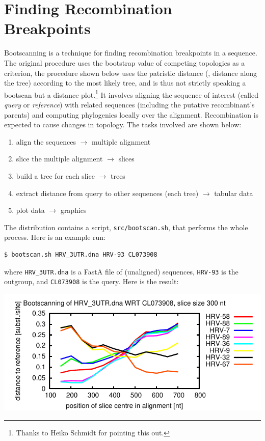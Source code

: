 \section{Finding Recombination Breakpoints}
\label{sct_bootscanning}

Bootscanning is a technique for finding recombination breakpoints in a
sequence. The original procedure \cite{Salminen_1995} uses the bootstrap value
of competing topologies as a criterion, the procedure shown below uses the
patristic distance (\ie, distance along the tree) according to the most likely
tree, and is thus not strictly speaking a bootscan but a distance
plot.\footnote{Thanks to Heiko Schmidt for pointing this out.} It involves
aligning the sequence of interest (called \emph{query} or \emph{reference})
with related sequences (including the putative recombinant's parents) and
computing phylogenies locally over the alignment.  Recombination is expected to
cause changes in topology.  The tasks involved are shown below:
\begin{enumerate}
\item align the sequences $\rightarrow$ multiple alignment
\item slice the multiple alignment $\rightarrow$ slices
\item build a tree for each slice $\rightarrow$ trees
\item extract distance from query to other sequences (each tree) $\rightarrow$ tabular data
\item plot data $\rightarrow$ graphics
\end{enumerate}
The distribution contains a script, \texttt{src/bootscan.sh}, that performs the whole process. Here is an example run:
\begin{verbatim}
$ bootscan.sh HRV_3UTR.dna HRV-93 CL073908
\end{verbatim}
where \texttt{HRV\_3UTR.dna} is a FastA file of (unaligned) sequences, \texttt{HRV-93} is the outgroup, and \texttt{CL073908} is the query.  Here is the result:

\begin{centering}
\includegraphics[width=\textwidth]{bootscan_1.pdf}
\end{centering}

